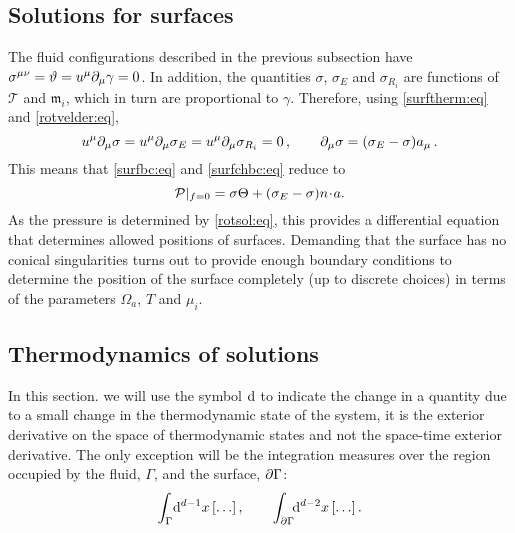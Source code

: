 \documentclass[12pt]{article}
\newcommand{\tloc}{\mathcal{T}}
\newcommand{\ploc}{\mathcal{P}}
\newcommand{\ml}{\mathfrak{m}}
\newcommand{\mg}{\mu}
\newcommand{\vint}{\int_\Gamma\!\dr^{d-1}x}
\newcommand{\aint}{\int_{\p\Gamma}\!\!\dr^{d-2}x}
\begin{document}
\subsection{Solutions for surfaces}\label{sec:rotsurf}

The fluid configurations described in the previous subsection have $\sigma^{\mu\nu}=\vartheta=u^\mu\partial_\mu\gamma=0$. 
In addition, the quantities $\sigma$, $\sigma_E$ and $\sigma_{R_i}$ are functions of $\tloc$ and $\ml_i$, which in turn are proportional to $\gamma$.
Therefore, using \eqref{surftherm:eq} and \eqref{rotvelder:eq},
%
\begin{equation}\label{rotsigmagrad:eq}
  u^\mu\partial_\mu\sigma=u^\mu\partial_\mu\sigma_E=u^\mu\partial_\mu\sigma_{R_i}=0\,,
  \qquad
  \partial_\mu \sigma = (\sigma_E - \sigma)a_\mu\,.
\end{equation}
%
This means that \eqref{surfbc:eq} and \eqref{surfchbc:eq} reduce to
%
\begin{equation}\label{rotsurfbc:eq}
  \ploc|_{f=0} = \sigma \Theta + (\sigma_E-\sigma)n\cdt a.
\end{equation}
%
As the pressure is determined by \eqref{rotsol:eq}, this provides a differential equation that determines allowed positions of surfaces. Demanding that the surface has no conical singularities turns out to provide enough boundary conditions to determine the position of the surface completely (up to discrete choices) in terms of the parameters $\Omega_a$, $T$ and $\mg_i$.

\subsection{Thermodynamics of solutions}\label{sec:rottherm}

In this section. we will use the symbol $\mathrm{d}$ to indicate the change in a quantity due to a small change in the thermodynamic state of the system, \ie it is the exterior derivative on the space of thermodynamic states and not the space-time exterior derivative. The only exception will be the integration measures over the region occupied by the fluid, $\Gamma$, and the surface, $\partial\Gamma$:
%
\begin{equation*}
  \vint\brk{\ldots}, \qquad \aint\brk{\ldots}.
\end{equation*}
%
\end{document}
